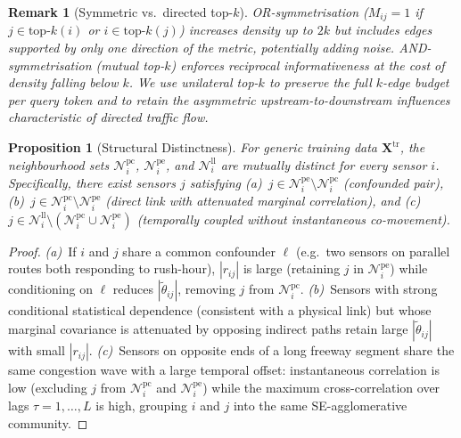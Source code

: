 \documentclass[letterpaper]{article}   %
\newtheorem{proposition}{Proposition}
\newtheorem{remark}{Remark}
\begin{document}
\begin{remark}[Symmetric vs.\ directed top-$k$]
\label{rem:symmetric}
OR-symmetrisation ($M_{ij}{=}1$ if $j\!\in\!\mathrm{top}\text{-}k(i)$ \emph{or}
$i\!\in\!\mathrm{top}\text{-}k(j)$) increases density up to $2k$ but includes edges
supported by only one direction of the metric, potentially adding noise.
AND-symmetrisation (mutual top-$k$) enforces reciprocal informativeness at the cost
of density falling below $k$.
We use unilateral top-$k$ to preserve the full $k$-edge budget per query token
and to retain the asymmetric upstream-to-downstream influences characteristic of
directed traffic flow.
\end{remark}

\begin{proposition}[Structural Distinctness]
\label{prop:distinct}
For generic training data $\mathbf{X}^{\mathrm{tr}}$, the neighbourhood sets
$\mathcal{N}^{\mathrm{pc}}_i$, $\mathcal{N}^{\mathrm{pe}}_i$, and
$\mathcal{N}^{\mathrm{ll}}_i$ are mutually distinct for every sensor $i$.
Specifically, there exist sensors $j$ satisfying
\emph{(a)}~$j \in \mathcal{N}^{\mathrm{pe}}_i \setminus \mathcal{N}^{\mathrm{pc}}_i$
(confounded pair),
\emph{(b)}~$j \in \mathcal{N}^{\mathrm{pc}}_i \setminus \mathcal{N}^{\mathrm{pe}}_i$
(direct link with attenuated marginal correlation), and
\emph{(c)}~$j \in \mathcal{N}^{\mathrm{ll}}_i \setminus
            (\mathcal{N}^{\mathrm{pc}}_i \cup \mathcal{N}^{\mathrm{pe}}_i)$
(temporally coupled without instantaneous co-movement).
\end{proposition}
\begin{proof}
\emph{(a)}~If $i$ and $j$ share a common confounder $\ell$ (e.g.\ two sensors on
parallel routes both responding to rush-hour), $|r_{ij}|$ is large (retaining $j$
in $\mathcal{N}^{\mathrm{pe}}_i$) while conditioning on $\ell$ reduces
$|\tilde{\theta}_{ij}|$, removing $j$ from $\mathcal{N}^{\mathrm{pc}}_i$.
\emph{(b)}~Sensors with strong conditional statistical dependence (consistent with a physical link) but whose marginal covariance is
attenuated by opposing indirect paths retain large $|\tilde{\theta}_{ij}|$ with
small $|r_{ij}|$.
\emph{(c)}~Sensors on opposite ends of a long freeway segment share the same
congestion wave with a large temporal offset: instantaneous correlation is low
(excluding $j$ from $\mathcal{N}^{\mathrm{pc}}_i$ and $\mathcal{N}^{\mathrm{pe}}_i$)
while the maximum cross-correlation over lags $\tau{=}1,\ldots,L$ is high,
grouping $i$ and $j$ into the same SE-agglomerative community.
\end{proof}
\end{document}
